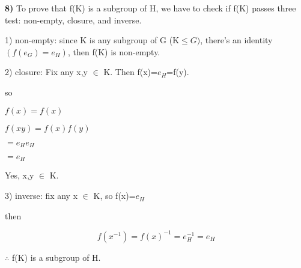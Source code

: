 \documentclass{article}
\begin{document}
\newpage

\textbf{8)} To prove that f(K) is a subgroup of H, we have to check if f(K) passes three test: non-empty, closure, and inverse.

\medskip

 
1) non-empty: since K is any subgroup of G (K$\leq G)$, there's an identity $(f(e_{G})=e_{H} )$, then f(K) is non-empty. 

\medskip

2) closure: Fix any x,y $\in$ K. Then f(x)=$e_{H}$=f(y).

so 

\medskip

$f(x)=f(x)$


$f(xy)=f(x)f(y)$


\hspace{.35in} $=e_{H}e_{H}$


\hspace{.35in} $=e_{H}$

\medskip

Yes, x,y $\in$ K.

\medskip

3) inverse: fix any x $\in$ K, so f(x)=$e_{H}$

\medskip

then 

$$f(x^{-1})=f(x)^{-1}=e_{H}^{-1}=e_{H}$$

\medskip

$\therefore$  f(K) is a subgroup of H.
\end{document}
